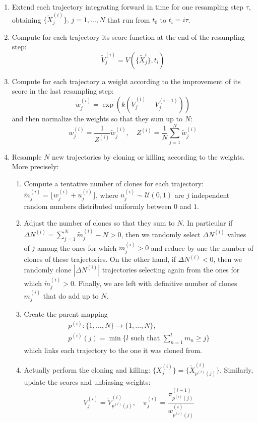 \begin{enumerate}
    \item Extend each trajectory integrating forward in time for one resampling step $\tau$, obtaining $\{\tilde{X}^{(i)}_j\}, \, j = 1, \ldots, N$ that run from $t_0$ to $t_i = i\tau$.

    \item Compute for each trajectory its score function at the end of the resampling step:
    $$\tilde{V}_j^{(i)} = V(\{\tilde{X}_j^{i}\}, t_i)$$

    \item Compute for each trajectory a weight according to the improvement of its score in the last resampling step:
    $$\tilde{w}_j^{(i)} = \exp\left( k\left( \tilde{V}_j^{(i)} - V_j^{(i-1)} \right) \right) $$
    and then normalize the weights so that they sum up to $N$:
    $$w_j^{(i)} = \frac{1}{Z^{(i)}} \tilde{w}_j^{(i)}, \quad Z^{(i)} = \frac{1}{N}\sum_{j=1}^N \tilde{w}_j^{(i)}$$

    \item Resample $N$ new trajectories by cloning or killing according to the weights. More precisely:
        \begin{enumerate}
            \item Compute a tentative number of clones for each trajectory: $\tilde{m}_j^{(i)} = \lfloor w_j^{(i)} + u_j^{(i)} \rfloor$, where $u_j^{(i)} \sim \mathcal{U}(0, 1)$ are $j$ independent random numbers distributed uniformly between $0$ and $1$.
            \item Adjust the number of clones so that they sum to $N$. In particular if $\Delta N^{(i)} = \sum_{j=1}^N \tilde{m}_j^{(i)} - N > 0$, then we randomly select $\Delta N^{(i)}$ values of $j$ among the ones for which $\tilde{m}_j^{(i)} > 0$ and reduce by one the number of clones of these trajectories. On the other hand, if $\Delta N^{(i)} < 0$, then we randomly clone $| \Delta N^{(i)} |$ trajectories selecting again from the ones for which $\tilde{m}_j^{(i)} > 0$. Finally, we are left with definitive number of clones $m_j^{(i)}$ that do add up to $N$.
            \item Create the parent mapping
            \begin{gather*}
                p^{(i)} : \{1, \ldots, N\} \rightarrow \{1, \ldots, N\}, \\ p^{(i)}(j) = \min \{l \text{ such that } \sum_{n=1}^l m_n \geq j\}
            \end{gather*}
            which links each trajectory to the one it was cloned from.
            \item Actually perform the cloning and killing: $\{X^{(i)}_j\} = \{\tilde{X}^{(i)}_{p^{(i)}(j)}\} $.
            Similarly, update the scores and unbiasing weights:
            $$V_j^{(i)} = \tilde{V}^{(i)}_{p^{(i)}(j)}, \quad \pi_j^{(i)} = \frac{\pi_{p^{(i)}(j)}^{(i-1)}}{w^{(i)}_{p^{(i)}(j)}}$$
        \end{enumerate}
\end{enumerate}

